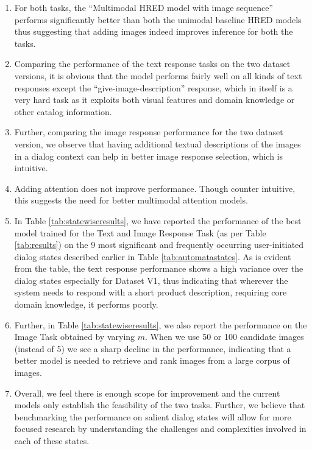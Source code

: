 \documentclass[letterpaper]{article} %
\begin{document}
\begin{enumerate}[$\bullet$,leftmargin=*,topsep=0pt]
\item For both tasks, the ``Multimodal HRED model with image sequence'' performs significantly better than both the unimodal baseline HRED models thus suggesting that adding images indeed improves inference for both the tasks. 
\item Comparing the performance of the text response tasks on the two dataset versions, it is obvious that the model performs fairly well on all kinds of text responses except the ``give-image-description'' response, which in itself is a very hard task as it exploits both visual features and domain knowledge or other catalog information.
\item Further, comparing the image response performance for the two dataset version, we observe that having additional textual descriptions of the images in a dialog context can help in better image response selection, which is intuitive.
\item Adding attention does not improve performance. Though counter intuitive, this suggests the need for better multimodal attention models.
\item In Table \ref{tab:statewiseresults}, we have reported the performance of the best model trained for the Text and Image Response Task (as per Table \ref{tab:results}) on the 9 most significant and frequently occurring user-initiated dialog states described earlier in Table \ref{tab:automatastates}. As is evident from the table, the text response performance shows a high variance over the dialog states especially for Dataset V1, thus indicating that wherever the system needs to respond with a short product description, requiring core domain knowledge, it performs poorly.
\item Further, in Table \ref{tab:statewiseresults}, we also report the performance on the Image Task obtained by varying $m$. When we use 50 or 100 candidate images (instead of 5) we see a sharp decline in the performance, indicating that a better model is needed to retrieve and rank images from a large corpus of images. 
\item Overall, we feel there is enough scope for improvement and the current models only establish the feasibility of the two tasks. Further, we believe that benchmarking the performance on salient dialog states will allow for more focused research by understanding the challenges and complexities involved in each of these states. 
\end{enumerate}
\end{document}
